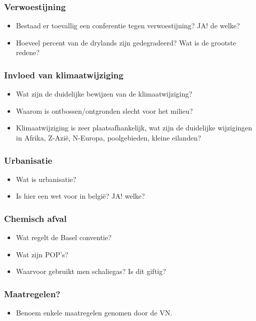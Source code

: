 \documentclass[12pt]{article}
\begin{document}
    \subsubsection*{Verwoestijning}
    \begin{itemize}
        \item Bestaad er toevallig een conferentie tegen verwoestijning? JA! de welke?
        \item Hoeveel percent van de drylands zijn gedegradeerd? Wat is de grootste redene?
    \end{itemize}

    \subsubsection*{Invloed van klimaatwijziging}
    \begin{itemize}
        \item Wat zijn de duidelijke bewijzen van de klimaatwijziging?
        \item Waarom is ontbossen/ontgronden slecht voor het milieu?
        \item Klimaatwijziging is zeer plaatsafhankelijk, wat zijn de duidelijke wijzigingen in Afrika, Z-Azië, N-Europa, poolgebieden, kleine eilanden?
    \end{itemize}

    \subsubsection*{Urbanisatie}
    \begin{itemize}
        \item Wat is urbanisatie?
        \item Is hier een wet voor in belgië? JA! welke?
    \end{itemize}

    \subsubsection*{Chemisch afval}
    \begin{itemize}
        \item Wat regelt de Basel conventie?
        \item Wat zijn POP's?
        \item Waarvoor gebruikt men schaliegas? Is dit giftig?
    \end{itemize}

    \subsubsection*{Maatregelen?}
    \begin{itemize}
        \item Benoem enkele maatregelen genomen door de VN.
    \end{itemize}
\end{document}
